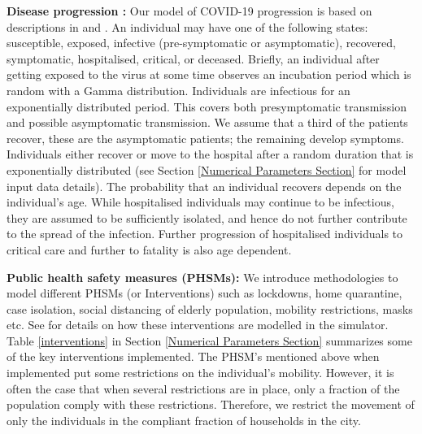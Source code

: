 \documentclass{article}
\theoremstyle{definition}
\begin{document}



\bigskip

\noindent \textbf{Disease progression :} Our model of COVID-19 progression is based on descriptions in \cite{verity2020estimates} and \cite{ferguson2020report}. An individual may have one of the following states: susceptible, exposed, infective (pre-symptomatic or asymptomatic), recovered, symptomatic, hospitalised, critical, or deceased. Briefly, an individual after getting exposed to the virus at some time observes an incubation period which is random with a Gamma distribution. Individuals are infectious for an exponentially distributed period. This covers both presymptomatic transmission and possible asymptomatic transmission. We assume that a third of the patients recover, these are the asymptomatic patients; the remaining develop symptoms. Individuals either recover or move to the hospital after a random duration that is exponentially distributed (see Section \ref{Numerical Parameters Section} for model input data details). The probability that an individual recovers depends on the individual's age. While hospitalised individuals may continue to be infectious, they are assumed to be sufficiently isolated, and hence do not further contribute to the spread of the infection. Further progression of hospitalised individuals to critical care and further to fatality is also age dependent. 

\bigskip

\noindent \textbf{Public health safety measures (PHSMs):} We introduce methodologies to model different PHSMs (or Interventions) such as lockdowns, home quarantine, case isolation, social distancing of elderly population, mobility restrictions, masks etc. See \cite{City_Simulator_IISc_TIFR_2020} for details on how these interventions are modelled in the simulator. Table \ref{interventions} in Section \ref{Numerical Parameters Section} summarizes some of the key interventions implemented. The PHSM's mentioned above when implemented put some restrictions on the individual's mobility. However, it is often the case that when several restrictions are in place, only a fraction of the population comply with these restrictions. Therefore, we restrict the movement of only the individuals in the compliant fraction of households in the city. 
\end{document}
